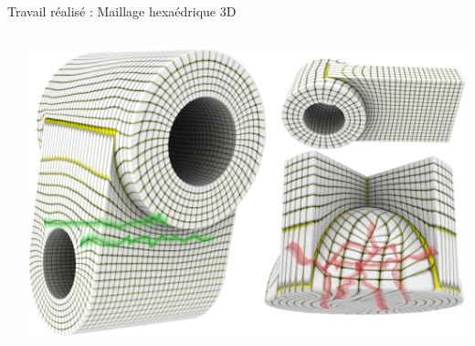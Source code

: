 \begin{frame}{Travail réalisé : Maillage hexaédrique 3D}
{\begin{columns}[T]
\begin{column}{.45\linewidth}
            \end{column}
            \begin{column}{.45\linewidth}
                \includegraphics[width=\linewidth]{img/hexmeshing_ff/prescribed_valences.png}
            \end{column}
        \end{columns}
    }
\end{frame}

